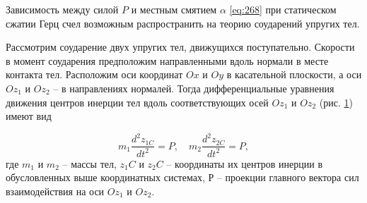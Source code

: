 \documentclass[specialist, subf, href, colorlinks=true, 14pt, final]{disser}
\theoremstyle{definition}
\begin{document}
Зависимость между силой $P$ и местным смятием $\alpha$ \eqref{eq:268} при статическом сжатии Герц счел возможным распространить на теорию соударений упругих тел.

Рассмотрим соударение двух упругих тел, движущихся 
поступательно. Скорости в момент соударения предположим 
направленными вдоль нормали в месте контакта тел. Расположим оси координат $Ox$ и $Oy$ в касательной плоскости, а оси $Oz_1$ и $Oz_2$ -- в направлениях нормалей. Тогда дифференциальные уравнения движения центров инерции тел вдоль соответствующих осей $Oz_1$ и $Oz_2$ (рис. \ref{2-6-1}) имеют вид
\addtocounter{equation}{1}
\begin{equation}\label{eq:269}
   m_1 \frac{d^2z_{1C}}{dt^2} = P, \quad m_2\frac{d^2z_{2C}}{dt^2} = P,
    \tag{9}
\end{equation}
где $m_1$ и $m_2$ -- массы тел, $z_1C$ и $z_2C$ -- координаты их  центров инерции в обусловленных выше координатных системах, $Р$ -- проекции главного вектора сил взаимодействия на оси $Oz_1$ и $Oz_2$.
\begin{figure}[!htp]
  \caption{}
  \label{2-6-1}
\end{figure}
\end{document}
